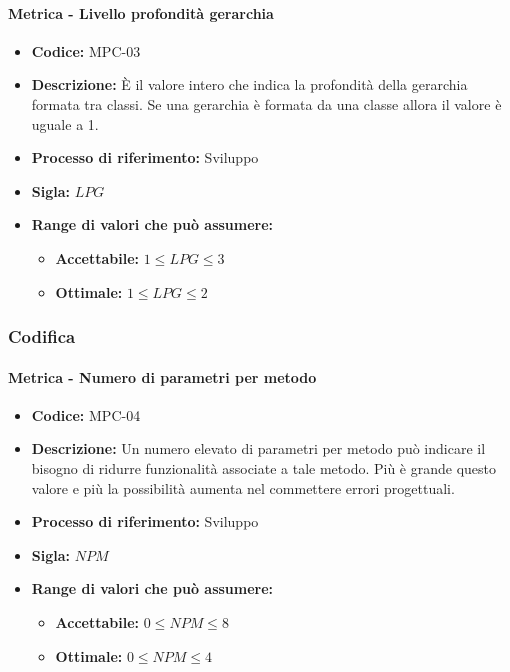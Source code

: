     \paragraph{Metrica - Livello profondità gerarchia}
    \begin{itemize}
        \item \textbf{Codice:} MPC-03
        \item \textbf{Descrizione:} È il valore intero che indica la profondità della gerarchia formata tra classi. Se una gerarchia è formata da una classe allora il valore è uguale a 1.
        \item \textbf{Processo di riferimento:} Sviluppo
        \item \textbf{Sigla:} $LPG$
        \item \textbf{Range di valori che può assumere:}
        \begin{itemize}
            \item \textbf{Accettabile:} $1 \leq{} LPG \leq 3$
            \item \textbf{Ottimale:} $1 \leq{} LPG \leq 2$
        \end{itemize}
    \end{itemize}

\subsubsection{Codifica}  
    \paragraph{Metrica - Numero di parametri per metodo} 
    \begin{itemize}
        \item \textbf{Codice:} MPC-04
        \item \textbf{Descrizione:} Un numero elevato di parametri per metodo può indicare il bisogno di ridurre funzionalità associate a tale metodo. Più è grande questo valore e più la possibilità aumenta nel commettere errori progettuali.
        \item \textbf{Processo di riferimento:} Sviluppo
        \item \textbf{Sigla:} $NPM$
        \item \textbf{Range di valori che può assumere:}
        \begin{itemize}
            \item \textbf{Accettabile:} $0 \leq{} NPM \leq 8$
            \item \textbf{Ottimale:} $0 \leq{} NPM \leq 4$
        \end{itemize}
    \end{itemize}

